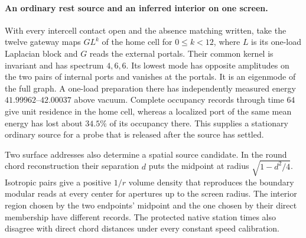 \documentclass[11pt]{article}
\begin{document}
\paragraph{An ordinary rest source and an inferred interior on one screen.}
With every intercell contact open and the absence matching written, take the twelve gateway maps \(G L^k\) of
the home cell for \(0\le k<12\), where \(L\) is its one-load
Laplacian block and \(G\) reads the external portals. Their common
kernel is invariant and has spectrum \(4,6,6\). Its lowest mode has
opposite amplitudes on the two pairs of internal ports and vanishes
at the portals. It is an eigenmode of the full graph. A one-load
preparation there has independently measured energy
\(41.99962\)--\(42.00037\) above vacuum. Complete occupancy records
through time \(64\) give unit residence in the home cell, whereas
a localized port of the same mean energy has lost about \(34.5\%\)
of its occupancy there. This supplies a stationary ordinary source
for a probe that is released after the source has settled.

Two surface addresses also determine a spatial source candidate.
In the round chord reconstruction their separation \(d\) puts the
midpoint at radius \(\sqrt{1-d^2/4}\). Isotropic pairs give a
positive \(1/r\) volume density that reproduces the boundary
modular reads at every center for apertures up to the screen radius.
The interior region chosen by the two endpoints' midpoint and the one
chosen by their direct membership have different records. The protected
native station times also disagree with direct chord distances under
every constant speed calibration.
\end{document}
